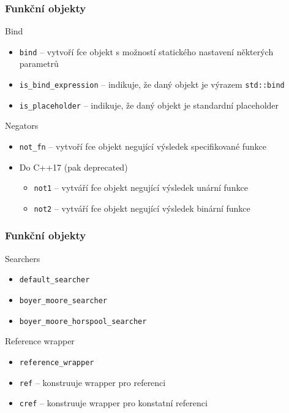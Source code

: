 \begin{frame}[fragile]
\frametitle{Funkční objekty}

\begin{block}{Bind}
\begin{itemize}
\item[\impbullet] \lstinline|bind| -- vytvoří fce objekt s možností statického nastavení některých parametrů
\item \lstinline|is_bind_expression| -- indikuje, že daný objekt je výrazem \lstinline|std::bind|
\item \lstinline|is_placeholder| -- indikuje, že daný objekt je standardní placeholder
\end{itemize}
\end{block}

\begin{block}{Negators}
\begin{itemize}
\item \lstinline|not_fn| -- vytvoří fce objekt negující výsledek specifikované funkce
\item Do C++17 (pak deprecated)
\begin{itemize}
\item[\impbulletl] \lstinline|not1| -- vytváří fce objekt negující výsledek unární funkce
\item[\impbulletl] \lstinline|not2| -- vytváří fce objekt negující výsledek binární funkce
\end{itemize}
\end{itemize}
\end{block}
\end{frame}


\begin{frame}[fragile]
\frametitle{Funkční objekty}
\begin{block}{Searchers}
\begin{itemize}
\item \lstinline|default_searcher|
\item \lstinline|boyer_moore_searcher|
\item \lstinline|boyer_moore_horspool_searcher|
\end{itemize}
\end{block}

\begin{block}{Reference wrapper}
\begin{itemize}
\item \lstinline|reference_wrapper|
\item[\impbulletl] \lstinline|ref| -- konstruuje wrapper pro referenci
\item[\impbulletl] \lstinline|cref| -- konstruuje wrapper pro konstatní referenci
\end{itemize}
\end{block}
\end{frame}


